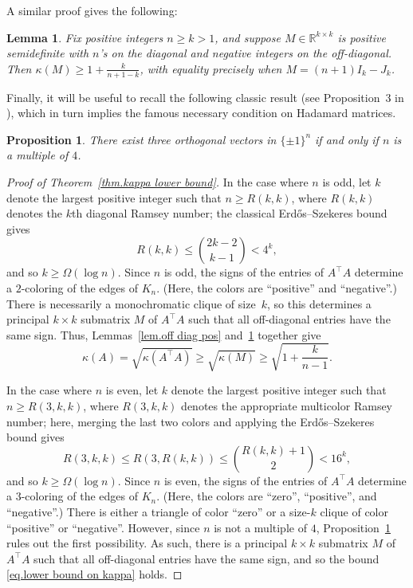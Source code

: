 \documentclass[11pt]{article}
\theoremstyle{plain}
\newtheorem{lemma}[theorem]{Lemma}
\newtheorem{proposition}[theorem]{Proposition}
\theoremstyle{definition}
\begin{document}
A similar proof gives the following:

\begin{lemma}
\label{lem.off diag neg}
Fix positive integers $n\geq k>1$, and suppose $M\in\mathbb{R}^{k\times k}$ is positive semidefinite with $n$'s on the diagonal and negative integers on the off-diagonal.
Then $\kappa(M)\geq 1+\frac{k}{n+1-k}$, with equality precisely when $M=(n+1)I_k-J_k$.
\end{lemma}

Finally, it will be useful to recall the following classic result (see Proposition~3 in \cite{BrowneEHC:21}), which in turn implies the famous necessary condition on Hadamard matrices.

\begin{proposition}
\label{prop.hadamard necessary condition}
There exist three orthogonal vectors in $\{\pm1\}^n$ if and only if $n$ is a multiple of $4$.
\end{proposition}

\begin{proof}[Proof of Theorem~\ref{thm.kappa lower bound}]
In the case where $n$ is odd, let $k$ denote the largest positive integer such that $n\geq R(k,k)$, where $R(k,k)$ denotes the $k$th diagonal Ramsey number; the classical Erd\H{o}s--Szekeres bound~\cite{ErdosS:35} gives
\[
R(k,k)
\leq \binom{2k-2}{k-1}<4^k,
\]
and so $k\geq\Omega(\log n)$.
Since $n$ is odd, the signs of the entries of $A^\top A$ determine a $2$-coloring of the edges of $K_n$.
(Here, the colors are ``positive'' and ``negative''.)
There is necessarily a monochromatic clique of size~$k$, so this determines a principal $k\times k$ submatrix $M$ of $A^\top A$ such that all off-diagonal entries have the same sign.
Thus, Lemmas~\ref{lem.off diag pos} and~\ref{lem.off diag neg} together give
\begin{equation}
\label{eq.lower bound on kappa}
\kappa(A)
=\sqrt{\kappa(A^\top A)}
\geq\sqrt{\kappa(M)}
\geq\sqrt{1+\frac{k}{n-1}}.
\end{equation}

In the case where $n$ is even, let $k$ denote the largest positive integer such that $n\geq R(3,k,k)$, where $R(3,k,k)$ denotes the appropriate multicolor Ramsey number; here, merging the last two colors and applying the Erd\H{o}s--Szekeres bound gives 
\[
R(3,k,k)
\leq R(3,R(k,k))
\leq \binom{R(k,k)+1}{2}
<16^k, 
\]
and so $k\geq\Omega(\log n)$.
Since $n$ is even, the signs of the entries of $A^\top A$ determine a $3$-coloring of the edges of $K_n$.
(Here, the colors are ``zero'', ``positive'', and ``negative''.)
There is either a triangle of color ``zero'' or a size-$k$ clique of color ``positive'' or ``negative''.
However, since $n$ is not a multiple of $4$, Proposition~\ref{prop.hadamard necessary condition} rules out the first possibility.
As such, there is a principal $k\times k$ submatrix $M$ of $A^\top A$ such that all off-diagonal entries have the same sign, and so the bound \eqref{eq.lower bound on kappa} holds.
\end{proof}
\end{document}
